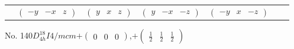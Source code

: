 \documentclass[fleqn,9pt,landscape]{jsarticle}
\begin{document}
\begin{center}
\begin{longtable}{ccccccc}
& $ \begin{pmatrix} - y & - x & z \end{pmatrix} $ & $ \begin{pmatrix} y & x & z \end{pmatrix} $ & $ \begin{pmatrix} y & - x & - z \end{pmatrix} $ & $ \begin{pmatrix} - y & x & - z \end{pmatrix} $ & $  $ & $  $ \\
\end{longtable}
\end{center}
\newpage
No. 140\quad$D_{4h}^{18}$\quad$I4/mcm$\quad[ tetragonal ]\quad$+\begin{pmatrix} 0 & 0 & 0 \end{pmatrix}$,\quad $+\begin{pmatrix} \frac{1}{2} & \frac{1}{2} & \frac{1}{2} \end{pmatrix}$
\end{document}
